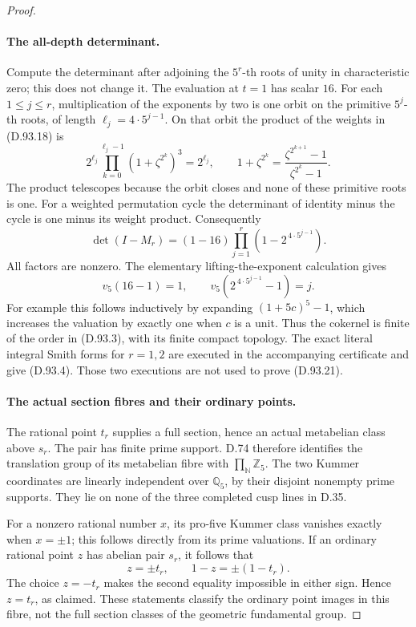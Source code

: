 \begin{proof}
\paragraph{The all-depth determinant.}
Compute the determinant after adjoining the \(5^r\)-th roots
of unity in characteristic zero; this does not change it.
The evaluation at \(t=1\) has scalar \(16\).
For each \(1\le j\le r\), multiplication of the exponents by
two is one orbit on the primitive \(5^j\)-th roots, of length
\(\ell_j=4\cdot5^{j-1}\). On that orbit the product of the
weights in (D.93.18) is
\[
 2^{\ell_j}\prod_{k=0}^{\ell_j-1}
       (1+\zeta^{2^k})^3
 =2^{\ell_j},
 \qquad
 1+\zeta^{2^k}
     =\frac{\zeta^{2^{k+1}}-1}{\zeta^{2^k}-1}.          \tag{D.93.20}
\]
The product telescopes because the orbit closes and none
of these primitive roots is one. For a weighted permutation
cycle the determinant of identity minus the cycle is one
minus its weight product. Consequently
\[
 \det(I-M_r)
      =(1-16)\prod_{j=1}^r
                 (1-2^{\,4\cdot5^{j-1}}).             \tag{D.93.21}
\]
All factors are nonzero. The elementary lifting-the-exponent
calculation gives
\[
 v_5(16-1)=1,\qquad
 v_5(2^{\,4\cdot5^{j-1}}-1)=j.
 \]
For example this follows inductively by expanding
\((1+5c)^5-1\), which increases the valuation by exactly
one when \(c\) is a unit. Thus the cokernel is finite of the
order in (D.93.3), with its finite compact topology.
The exact literal integral Smith forms for \(r=1,2\) are
executed in the accompanying certificate and give (D.93.4).
Those two executions are not used to prove (D.93.21).

\paragraph{The actual section fibres and their ordinary points.}
The rational point \(t_r\) supplies a full section, hence an
actual metabelian class above \(s_r\). The pair has finite
prime support. D.74 therefore identifies the translation
group of its metabelian fibre with
\(\prod_{\mathbb N}\mathbb Z_5\).
The two Kummer coordinates are linearly independent over
\(\mathbb Q_5\), by their disjoint nonempty prime supports.
They lie on none of the three completed cusp lines in D.35.

For a nonzero rational number \(x\), its pro-five Kummer
class vanishes exactly when \(x=\pm1\); this follows directly
from its prime valuations. If an ordinary rational point
\(z\) has abelian pair \(s_r\), it follows that
\[
                  z=\pm t_r,\qquad
                  1-z=\pm(1-t_r).
 \]
The choice \(z=-t_r\) makes the second equality impossible
in either sign. Hence \(z=t_r\), as claimed. These statements
classify the ordinary point images in this fibre, not the
full section classes of the geometric fundamental group.
\end{proof}
